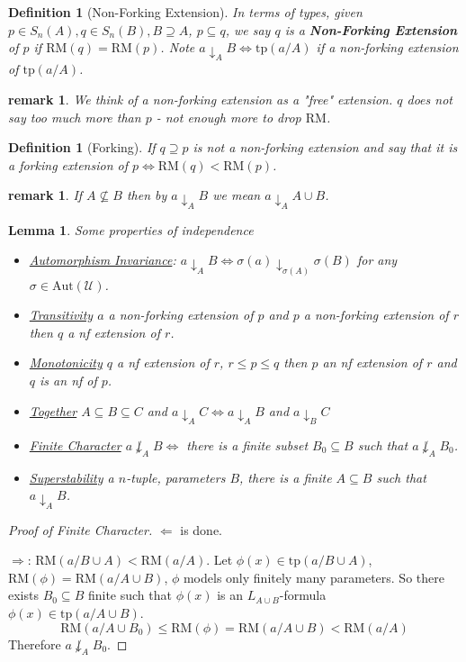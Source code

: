 \documentclass[letterpaper, 12pt]{article}
\newcommand{\fin}{\qquad \quad \hfill \framebox[1.75mm][l]{\,}}
\newcommand{\cU}{\mathcal{U}}
\newcommand{\Aut}{\mbox{Aut}}
\newcommand{\tp}{\mbox{tp}}
\newcommand{\RM}{\mbox{RM}}
\theoremstyle{stdthm}
\newtheorem{lem}[thm]{Lemma}
\theoremstyle{stddef}
\newtheorem{defn}[thm]{Definition}
\newtheorem{rem}[thm]{remark} %
\theoremstyle{stdnonum}
\theoremstyle{stdqands}
\theoremstyle{stdbold}
\begin{document}
\begin{defn}[Non-Forking Extension]
In terms of types, given $p \in S_n(A), q\in S_n(B), B \supseteq A$, $p\subseteq q$, we say $q$ is a {\bf Non-Forking Extension} of $p$ if $\RM(q) = \RM(p)$. Note $a \downarrow_A B \iff \tp(a/A)$ if a non-forking extension of $\tp(a/A)$.
\end{defn}


\begin{rem}
 We think of a non-forking extension as a "free" extension. $q$ does not say too much more than $p$ - not enough more to drop $\RM$. 
\end{rem}


\begin{defn} [Forking]
If $q \supseteq p$ is not a non-forking extension and say that it is a forking extension of $p \iff \RM(q) < \RM(p)$. 
\end{defn}

\begin{rem}
If $A\nsubseteq B$ then by $a \downarrow_A B$ we mean $a \downarrow_A A \cup B$. 
\end{rem}

\begin{lem}
Some properties of independence 
\begin{itemize}
\item \underline{Automorphism Invariance}: $a\downarrow_A B \iff \sigma(a) \downarrow_{\sigma(A)} \sigma(B)$ for any $\sigma \in \Aut(\cU)$. 
\item \underline{Transitivity} $a$ a non-forking extension of $p$ and $p$ a non-forking extension of $r$ then $q$ a nf extension of $r$. 
\item \underline{Monotonicity}  $q$ a nf extension of $r$, $r \leq p \leq q$ then $p$ an nf extension of $r$ and $q$ is an nf of $p$.
\item \underline{Together} $A \subseteq B \subseteq C$ and $a \downarrow_A C \iff a \downarrow_A B$ and $a\downarrow_B C$ 
\item \underline{Finite Character} $a \not \downarrow_A B \iff $ there is a finite subset $B_0 \subseteq B$ such that $a \not \downarrow_A B_0$.
\item \underline{Superstability} a $n$-tuple, parameters $B$, there is a finite $A \subseteq B$ such that $a \downarrow_A B$.  
\end{itemize}

\end{lem}

\begin{proof} [Proof of Finite Character]
$\Leftarrow$ is done. 

$\Rightarrow$: $\RM(a/B \cup A) < \RM(a/A)$. Let $\phi(x) \in \tp(a/B \cup A)$, $\RM(\phi) = \RM(a/A\cup B)$, $\phi$ models only finitely many parameters. So there exists $B_0\subseteq B$ finite such that $\phi(x)$ is an $L_{A\cup B}$-formula $\phi(x) \in \tp(a/A\cup B)$. 
\[ \RM(a/A\cup B_0) \leq \RM(\phi) = \RM(a/A\cup B) < \RM(a/A) \]
Therefore $a \not \downarrow_A B_0$. 
\end{proof}
\end{document}
